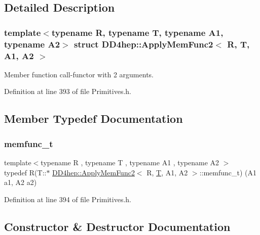 \subsection{Detailed Description}
\subsubsection*{template$<$typename R, typename T, typename A1, typename A2$>$\newline
struct D\+D4hep\+::\+Apply\+Mem\+Func2$<$ R, T, A1, A2 $>$}

Member function call-\/functor with 2 arguments. 

Definition at line 393 of file Primitives.\+h.



\subsection{Member Typedef Documentation}
\hypertarget{struct_d_d4hep_1_1_apply_mem_func2_a73ec255989fcf165046db1689d8c748a}{}\label{struct_d_d4hep_1_1_apply_mem_func2_a73ec255989fcf165046db1689d8c748a} 
\subsubsection{\texorpdfstring{memfunc\+\_\+t}{memfunc\_t}}
{\footnotesize\ttfamily template$<$typename R , typename T , typename A1 , typename A2 $>$ \\
typedef R(T\+::$\ast$ \hyperlink{struct_d_d4hep_1_1_apply_mem_func2}{D\+D4hep\+::\+Apply\+Mem\+Func2}$<$ R, \hyperlink{class_t}{T}, A1, A2 $>$\+::memfunc\+\_\+t) (A1 a1, A2 a2)}



Definition at line 394 of file Primitives.\+h.



\subsection{Constructor \& Destructor Documentation}
\hypertarget{struct_d_d4hep_1_1_apply_mem_func2_a0ba82d9b15161c878526ffc012f449f6}{}\label{struct_d_d4hep_1_1_apply_mem_func2_a0ba82d9b15161c878526ffc012f449f6} 
